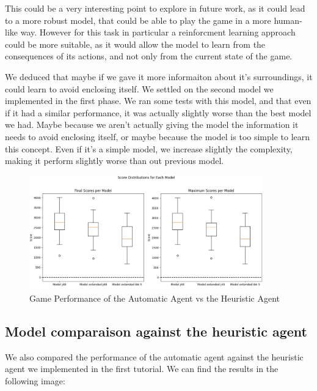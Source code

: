 \documentclass[12pt,a4paper]{article}
\begin{document}
This could be a very interesting point to explore in future work, as it could lead to a more robust model, that could be able to play the game in a more human-like way.
However for this task in particular a reinforcment learning approach could be more suitable, as it would allow the model to learn from the consequences of its actions, and not only from the current state of the game.

We deduced that maybe if we gave it more informaiton about it's surroundings, it could learn to avoid enclosing itself.
We settled on the second model we implemented in the first phase. 
We ran some tests with this model, and that even if it had a similar performance, it was actually slightly worse than the best model we had.
Maybe because we aren't actually giving the model the information it needs to avoid enclosing itself, or maybe because the model is too simple to learn this concept.
Even if it's a simple model, we increase slightly the complexity, making it perform slightly worse than out previous model.

\begin{figure}[ht]
    \centering
    \includegraphics[width=0.9\textwidth]{./images/extended.png} %
    \caption{Game Performance of the Automatic Agent vs the Heuristic Agent}
    \label{fig:game}
\end{figure}


\subsection{Model comparaison against the heuristic agent}

We also compared the performance of the automatic agent against the heuristic agent we implemented in the first tutorial.
We can find the results in the following image:
\end{document}
